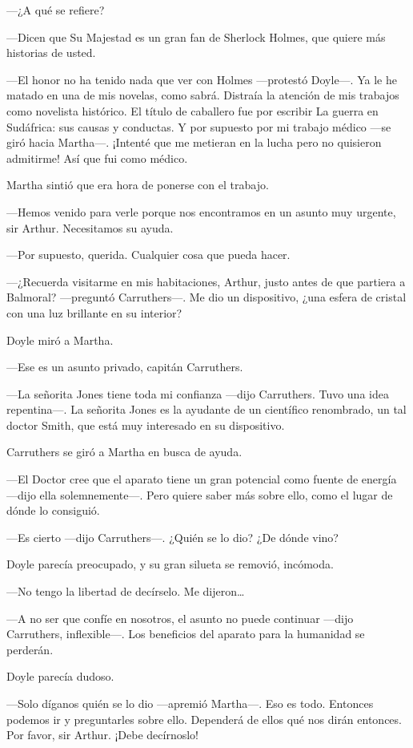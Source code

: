 ---¿A qué se refiere?

---Dicen que Su Majestad es un gran fan de Sherlock Holmes, que quiere
más historias de usted.

---El honor no ha tenido nada que ver con Holmes ---protestó Doyle---.
Ya le he matado en una de mis novelas, como sabrá. Distraía la atención
de mis trabajos como novelista histórico. El título de caballero fue por
escribir La guerra en Sudáfrica: sus causas y conductas. Y por supuesto
por mi trabajo médico ---se giró hacia Martha---. ¡Intenté que me
metieran en la lucha pero no quisieron admitirme! Así que fui como
médico.

Martha sintió que era hora de ponerse con el trabajo.

---Hemos venido para verle porque nos encontramos en un asunto muy
urgente, sir Arthur. Necesitamos su ayuda.

---Por supuesto, querida. Cualquier cosa que pueda hacer.

---¿Recuerda visitarme en mis habitaciones, Arthur, justo antes de que
partiera a Balmoral? ---preguntó Carruthers---. Me dio un dispositivo,
¿una esfera de cristal con una luz brillante en su interior?

Doyle miró a Martha.

---Ese es un asunto privado, capitán Carruthers.

---La señorita Jones tiene toda mi confianza ---dijo Carruthers. Tuvo
una idea repentina---. La señorita Jones es la ayudante de un científico
renombrado, un tal doctor Smith, que está muy interesado en su
dispositivo.

Carruthers se giró a Martha en busca de ayuda.

---El Doctor cree que el aparato tiene un gran potencial como fuente de
energía ---dijo ella solemnemente---. Pero quiere saber más sobre ello,
como el lugar de dónde lo consiguió.

---Es cierto ---dijo Carruthers---. ¿Quién se lo dio? ¿De dónde vino?

Doyle parecía preocupado, y su gran silueta se removió, incómoda.

---No tengo la libertad de decírselo. Me dijeron\ldots{}

---A no ser que confíe en nosotros, el asunto no puede continuar ---dijo
Carruthers, inflexible---. Los beneficios del aparato para la humanidad
se perderán.

Doyle parecía dudoso.

---Solo díganos quién se lo dio ---apremió Martha---. Eso es todo.
Entonces podemos ir y preguntarles sobre ello. Dependerá de ellos qué
nos dirán entonces. Por favor, sir Arthur. ¡Debe decírnoslo!